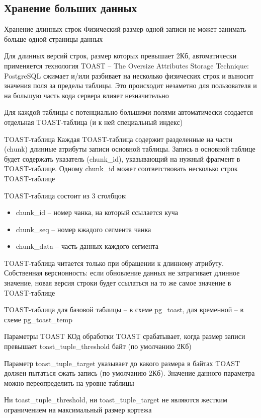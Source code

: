 \documentclass[12pt]{article}
\begin{document}
\newpage 

\subsection{Хранение больших данных}

\begin{nota}{Хранение длинных строк}
    Физический размер одной записи не может занимать больше одной страницы данных 

    Для длинных версий строк, размер которых превышает 2Кб, автоматически применяется технология TOAST -- The Oversize Attributes Storage Technique: PostgreSQL сжимает и/или разбивает на несколько физических строк и выносит значения поля за пределы таблицы. Это происходит незаметно для пользователя и на большую часть кода сервера влияет незначительно 

    Для каждой таблицы с потенциально большими полями автоматически создается отдельная TOAST-таблица (и к ней специальный индекс)
\end{nota}

\begin{nota}{TOAST-таблица}
    Каждая TOAST-таблица содержит разделенные на части (chunk) длинные атрибуты записи основной таблицы. Запись в основной таблице будет содержать указатель (chunk\_id), указывающий на нужный фрагмент в TOAST-таблице. Одному chunk\_id может соответствовать несколько строк TOAST-таблице 

    TOAST-таблица состоит из 3 столбцов:

    \begin{itemize}
        \item chunk\_id -- номер чанка, на который ссылается куча 
        \item chunk\_seq -- номер кжадого сегмента чанка 
        \item chunk\_data -- часть данных каждого сегмента 
    \end{itemize}

    TOAST-таблица читается только при обращении к длинному атрибуту. Собственная версионность: если обновление данных не затрагивает длинное значение, новая версия строки будет ссылаться на то же самое значение в TOAST-таблице

    TOAST-таблица для базовой таблицы -- в схеме pg\_toast, для временной -- в схеме pg\_toast\_temp
\end{nota}

\begin{nota}{Параметры TOAST}
    КОд обработки TOAST срабатывает, когда размер записи превышает toast\_tuple\_threshold байт (по умолчанию 2Кб)

    Параметр toast\_tuple\_target указывает до какого размера в байтах TOAST должен пытаться сжать запись (по умолчанию 2Кб). Значение данного параметра можно переопределить на уровне таблицы 

    Ни toast\_tuple\_threshold, ни toast\_tuple\_target не являются жестким ограничением на максимальный размер кортежа 
\end{nota}
\end{document}
